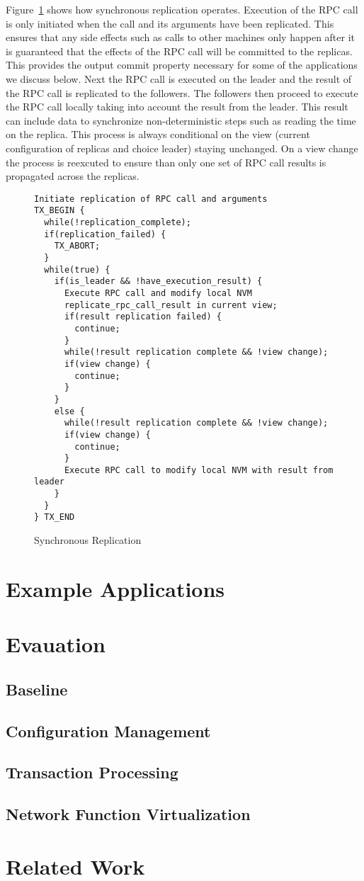 \documentclass[twocolumn]{article}
\begin{document}
Figure~\ref{fig:sync_rep} shows how synchronous replication operates. Execution
of the RPC call is only initiated when the call and its arguments have been
replicated. This ensures that any side effects such as calls to other machines
only happen after it is guaranteed that the effects of the RPC call will be
committed to the replicas. This provides the output commit property necessary
for some of the applications we discuss below. Next the RPC call is executed on
the leader and the result of the RPC call is replicated to the followers. The
followers then proceed to execute the RPC call locally taking into account the
result from the leader. This result can include data to synchronize
non-deterministic steps such as reading the time on the replica. This process is
always conditional on the view (current configuration of replicas and choice
leader) staying unchanged. On a view change the process is reexcuted to ensure
than only one set of RPC call results is propagated across the replicas. 

\begin{figure}
{\scriptsize
\begin{verbatim}
Initiate replication of RPC call and arguments
TX_BEGIN {
  while(!replication_complete);
  if(replication_failed) {
    TX_ABORT;
  }  
  while(true) {
    if(is_leader && !have_execution_result) {
      Execute RPC call and modify local NVM
      replicate_rpc_call_result in current view;
      if(result replication failed) {
        continue;
      }
      while(!result replication complete && !view change);
      if(view change) {
        continue;
      }
    }
    else {
      while(!result replication complete && !view change);
      if(view change) {
        continue;
      }
      Execute RPC call to modify local NVM with result from leader
    }
  }
} TX_END
\end{verbatim}
}
\caption{Synchronous Replication}
\label{fig:sync_rep}
\end{figure}


\section{Example Applications}

\section{Evauation}

\subsection{Baseline}

\subsection{Configuration Management}

\subsection{Transaction Processing}

\subsection{Network Function Virtualization}

\section{Related Work}
\end{document}
